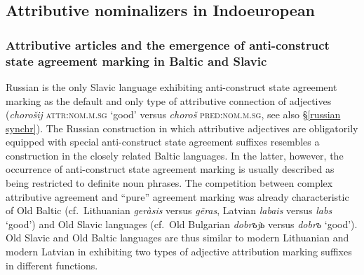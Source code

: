 \subsection{Attributive nominalizers in Indoeuropean} \label{ie diachr}

\subsubsection[Baltic and Slavic]{Attributive articles and the emergence of anti-construct state agreement marking in Baltic and Slavic} \label{slavic diachr}

Russian is the only Slavic language exhibiting anti-construct state agreement marking as the default and only type of attributive connection of adjectives (\textit{chorošij} \textsc{attr:nom.m.sg} ‘good’ versus \textit{choroš} \textsc{pred:nom.m.sg}, see also \S\ref{russian synchr}). The Russian construction in which attributive adjectives are obligatorily equipped with special anti-construct state agreement suffixes resembles a construction in the closely related Baltic languages. In the latter, however, the occurrence of anti-construct state agreement marking is usually described as being restricted to definite noun phrases. The competition between complex attributive agreement and “pure” agreement marking was  already characteristic of Old Baltic (cf.~Lithuanian \textit{geràsis} versus \textit{g{\~e}ras}, Latvian \textit{labais} versus \textit{labs} ‘good’) and Old Slavic languages (cf.~Old Bulgarian \textit{dobrъjь} versus \textit{dobrъ} ‘good’). Old Slavic and Old Baltic languages are thus similar to modern Lithuanian and modern Latvian in exhibiting two types of adjective attribution marking suffixes in different functions.

